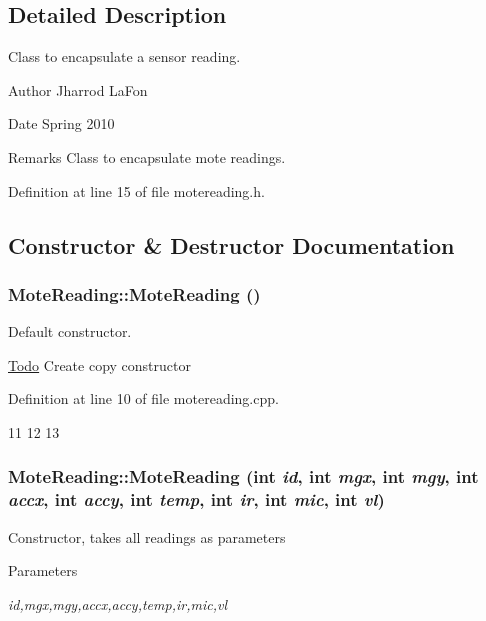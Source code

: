 \subsection{Detailed Description}
Class to encapsulate a sensor reading. \begin{DoxyAuthor}{Author}
Jharrod LaFon 
\end{DoxyAuthor}
\begin{DoxyDate}{Date}
Spring 2010 
\end{DoxyDate}
\begin{DoxyRemark}{Remarks}
Class to encapsulate mote readings. 
\end{DoxyRemark}


Definition at line 15 of file motereading.h.



\subsection{Constructor \& Destructor Documentation}
\hypertarget{classMoteReading_ad2555254ab4fd4ce31ebafeea362d255}{
\subsubsection[{MoteReading}]{\setlength{\rightskip}{0pt plus 5cm}MoteReading::MoteReading ()}}
\label{classMoteReading_ad2555254ab4fd4ce31ebafeea362d255}


Default constructor. 

\begin{Desc}
\item[\hyperlink{todo__todo000003}{Todo}]Create copy constructor \end{Desc}


Definition at line 10 of file motereading.cpp.




\begin{DoxyCode}
11 {
12 
13 }
\end{DoxyCode}


\hypertarget{classMoteReading_aea4d9a40d3999ed29eb6044146a5dabc}{
\subsubsection[{MoteReading}]{\setlength{\rightskip}{0pt plus 5cm}MoteReading::MoteReading (int {\em id}, \/  int {\em mgx}, \/  int {\em mgy}, \/  int {\em accx}, \/  int {\em accy}, \/  int {\em temp}, \/  int {\em ir}, \/  int {\em mic}, \/  int {\em vl})}}
\label{classMoteReading_aea4d9a40d3999ed29eb6044146a5dabc}
Constructor, takes all readings as parameters 
\begin{DoxyParams}{Parameters}
\item[{\em id,mgx,mgy,accx,accy,temp,ir,mic,vl}]\end{DoxyParams}


